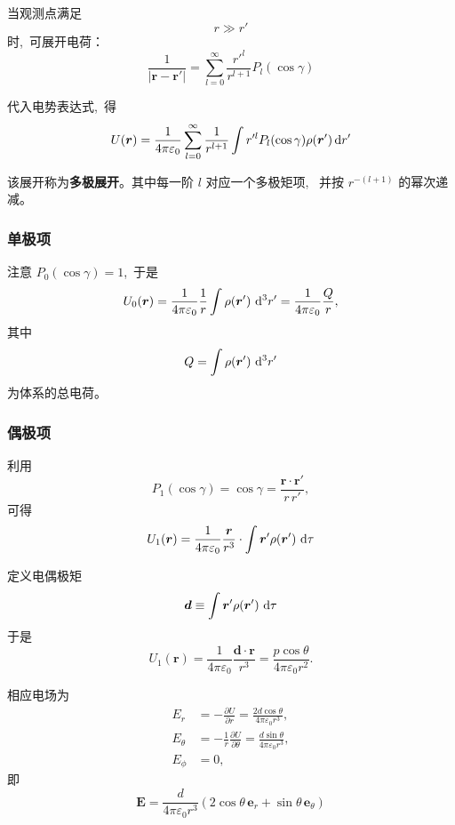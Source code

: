 当观测点满足
\[
r\gg r'
\]
时, \,可展开电荷：
\begin{equation}
\frac{1}{|\boldsymbol r-\boldsymbol r'|}
=
\sum_{l=0}^{\infty}
\frac{r'^l}{r^{l+1}}
P_l(\cos\gamma)
\end{equation}

代入电势表达式, \,得
\begin{equation}
U(\boldsymbol r)
=
\frac{1}{4\pi\varepsilon_0}
\sum_{l=0}^{\infty}
\frac{1}{r^{l+1}}
\int
r'^l
P_l(\cos\gamma)
\rho(\boldsymbol r')
\dif r'
\end{equation}

该展开称为\textbf{多极展开}。其中每一阶 $l$ 对应一个多极矩项, \,
并按 $r^{-(l+1)}$ 的幂次递减。

\subsubsection{单极项}

注意 $P_0(\cos\gamma)=1$, \,于是
\begin{equation}
U_0(\boldsymbol r)
=
\frac{1}{4\pi\varepsilon_0}
\frac{1}{r}
\int \rho(\boldsymbol r')\,\dif^3 r'
=
\frac{1}{4\pi\varepsilon_0}
\frac{Q}{r},
\end{equation}
其中
\[
Q=\int \rho(\boldsymbol r')\,\dif^3 r'
\]
为体系的总电荷。

\subsubsection{偶极项}

利用
\[
P_1(\cos\gamma)=\cos\gamma
=
\frac{\boldsymbol r\cdot\boldsymbol r'}{r\,r'},
\]
可得
\begin{equation}
U_1(\boldsymbol r)
=
\frac{1}{4\pi\varepsilon_0}
\frac{\boldsymbol r}{r^3}\cdot
\int \boldsymbol r'\rho(\boldsymbol r')\,\dif\tau
\end{equation}

定义电偶极矩
\[
\boldsymbol d
\equiv
\int \boldsymbol r'\rho(\boldsymbol r')\,\dif\tau
\]
于是
\begin{equation}
U_1(\boldsymbol r)
=
\frac{1}{4\pi\varepsilon_0}
\frac{\boldsymbol d\cdot\boldsymbol r}{r^3}
=
\frac{p\cos\theta}{4\pi\varepsilon_0 r^2}.
\end{equation}

相应电场为
\begin{align}
E_r&=-\frac{\partial U}{\partial r}
=\frac{2d\cos\theta}{4\pi\varepsilon_0 r^3},\\
E_\theta&=-\frac{1}{r}\frac{\partial U}{\partial \theta}
=\frac{d\sin\theta}{4\pi\varepsilon_0 r^3},\\
E_\phi&=0,
\end{align}
即
\begin{equation}
    \boldsymbol E
=
\frac{d}{4\pi\varepsilon_0 r^3}
\left(
2\cos\theta\,\boldsymbol e_r
+
\sin\theta\,\boldsymbol e_\theta
\right)\label{偶极子电场}
\end{equation}


